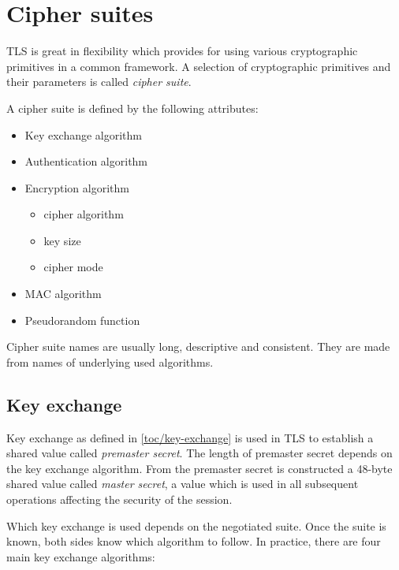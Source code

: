 \section{Cipher suites}

TLS is great in flexibility which provides for using various cryptographic primitives in a common framework. A selection of cryptographic primitives and their parameters is called \textit{cipher suite}.

A cipher suite is defined by the following attributes:

\begin{itemize}
  \item Key exchange algorithm
  \item Authentication algorithm
  \item Encryption algorithm
  \begin{itemize}
    \item cipher algorithm
    \item key size
    \item cipher mode
  \end{itemize}
  \item MAC algorithm
  \item Pseudorandom function
\end{itemize}

Cipher suite names are usually long, descriptive and consistent. They are made from names of underlying used algorithms.

\subsection{Key exchange}

Key exchange as defined in \autoref{toc/key-exchange} is used in TLS to establish a shared value called \textit{premaster secret}. The length of premaster secret depends on the key exchange algorithm. From the premaster secret is constructed a 48-byte shared value called \textit{master secret}, a value which is used in all subsequent operations affecting the security of the session.

Which key exchange is used depends on the negotiated suite. Once the suite is known, both sides know which algorithm to follow. In practice, there are four main key exchange algorithms:

